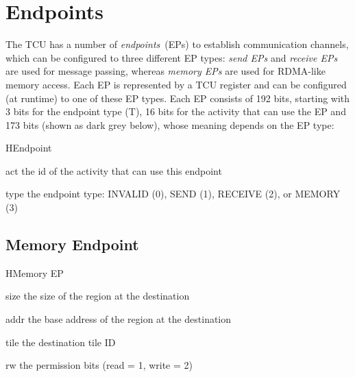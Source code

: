 \chapter{Endpoints}

The TCU has a number of \emph{endpoints}~(EPs) to establish communication channels, which can be
configured to three different EP types: \emph{send EPs} and \emph{receive EPs} are used for message
passing, whereas \emph{memory EPs} are used for RDMA-like memory access. Each EP is represented by a
TCU register and can be configured (at runtime) to one of these EP types. Each EP consists of 192
bits, starting with 3 bits for the endpoint type (T), 16 bits for the activity that can use the EP and
173 bits (shown as dark grey below), whose meaning depends on the EP type:\\[.1em]

\begin{register}{H}{Endpoint}{}
  \regnewline%
  \regnewline%
  \regnewline%
  \begin{regdesc}\begin{reglist}
    \item[act]  the id of the activity that can use this endpoint \extend{}
    \item[type] the endpoint type: INVALID (0), SEND (1), RECEIVE (2), or MEMORY (3)
  \end{reglist}\end{regdesc}
\end{register}

\section{Memory Endpoint}

\begin{register}{H}{Memory EP}{}
  \regnewline%
  \regnewline%
  \regnewline%
  \begin{regdesc}\begin{reglist}
    \item[size] the size of the region at the destination
    \item[addr] the base address of the region at the destination
    \item[tile] the destination tile ID
    \item[rw] the permission bits (read = 1, write = 2)
  \end{reglist}\end{regdesc}
\end{register}

